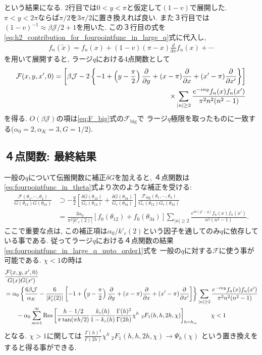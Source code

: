 という結果になる. 
2行目では$0 < y < \pi$と仮定して$(1 - v)$で展開した. 
$\pi < y < 2\pi$ならば$\pi / 2$を$3\pi / 2$に置き換えれば良い. 
また３行目では$(1-v)^{-1}\approx \beta\mathcal{J}/2 + 1$を用いた. 
この３行目の式を\eqref{eq:h2_contribution_for_fourpointfunc_in_large_q}式に代入し, 
\begin{align}
	f_n(\tilde{x}) = f_n(x) + (1-v)(\pi - x)\frac{d}{dx}f_n(x) + \cdots
\end{align}
を用いて展開すると, ラージ$q$における4点関数として
\begin{align}
	\mathcal{F}(x, y, x', 0)
	= \left[
		\beta\mathcal{J} - 2\left\{-1 + \left(y - \frac{\pi}{2}\right)\frac{\partial}{\partial y}
		+ (x-\pi)\frac{\partial}{\partial x} + (x' - \pi)\frac{\partial}{\partial x'}\right\}
	\right]\nonumber\\
	\times \sum_{|n|\geq 2} \frac{e^{-iny}f_n(x)f_n(x')}{\pi^2n^2(n^2-1)}
	\label{eq:fourpointfunc_in_large_q_upto_order1}
\end{align}
を得る. 
$O(\beta\mathcal{J})$の項は\eqref{eq:F_big}式の$\mathcal{F}_{\mathrm{big}}$で
ラージ$q$極限を取ったものに一致する($\alpha_0=2, \alpha_K=3, G=1/2$). 

\subsection{４点関数: 最終結果}
一般の$q$について伝搬関数に補正$\delta G$を加えると, 
４点関数は\eqref{eq:fourpointfunc_in_theta}式より次のような補正を受ける:
\begin{align}
	\frac{\mathcal{F}(\theta_1, \cdots, \theta_4)}{G(\theta_{12})G(\theta_{34})}
	&\supset -\frac{q}{2}
		\left[
			\frac{\delta G(\theta_{12})}{G_c(\theta_{12})}
			+ \frac{\delta G(\theta_{34})}{G_c(\theta_{34})}
		\right]
		\frac{\mathcal{F}_{\mathrm{big}}(\theta_1, \cdots, \theta_4)}
			{G_c(\theta_{12})G_c(\theta_{34})}\\
	&= \frac{3\alpha_0}{\pi^2|k'_c(2)|}[f_0(\theta_{12}) + f_0(\theta_{34})]
		\sum_{|n|\geq 2}\frac{e^{in(y'-y)}f_n(x)f_n(x')}{n^2(n^2-1)}.
\end{align}
ここで重要な点は, この補正項は$\alpha_0 / k'_c(2)$という因子を通してのみ$q$に依存している事である. 
従ってラージ$q$における４点関数の結果\eqref{eq:fourpointfunc_in_large_q_upto_order1}式を
一般の$q$に対する$\mathcal{F}$に使う事が可能である. 
$\chi < 1$の時は
\begin{align}
	&\frac{\mathcal{F}(x,y,x',0)}{G(x)G(x')}\nonumber\\
	&= \alpha_0\left\{
		\frac{6\beta\mathcal{J}}{\alpha_K} - \frac{6}{|k'_c(2)|}
		\left[
			-1 + \left(y-\frac{\pi}{2}\right)\frac{\partial}{\partial y}
			+ (x - \pi)\frac{\partial}{\partial x} + (x' - \pi)\frac{\partial}{\partial x'}
		\right]
	\right\}\sum_{|n|\geq 2}\frac{e^{-iny}f_n(x)f_n(x')}{\pi^2n^2(n^2-1)}\nonumber\\
	&\hspace{20pt}
	-\alpha_0\sum_{m=1}^{\infty}\mathrm{Res}\left[
		\frac{h-1/2}{\pi\tan(\pi h/2)}\frac{k_c(h)}{1-k_c(h)}\frac{\Gamma(h)^2}{\Gamma(2h)}
		\chi^h\ {}_2F_1(h, h, 2h, \chi)
	\right]_{h=h_m}
	\hspace{20pt}\chi < 1
\end{align}
となる. 
$\chi > 1$に関しては
$\frac{\Gamma(h)^2}{\Gamma(2h)}\chi^h\ {}_2F_1(h, h, 2h, \chi)\to \Psi_h(\chi)$
という置き換えをすると得る事ができる. 

\pagebreak
